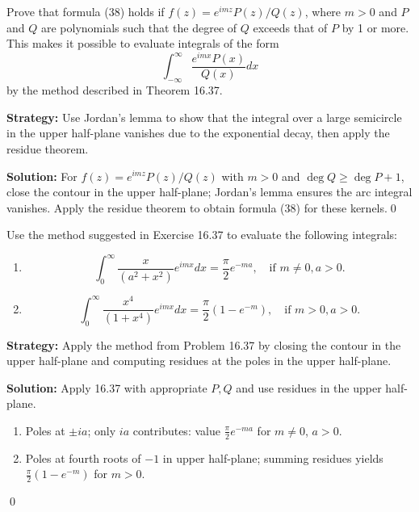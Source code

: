 \begin{problembox}
\begin{problemstatement}
Prove that formula (38) holds if \( f(z) = e^{imz} P(z) / Q(z) \), where \( m > 0 \) and \( P \) and \( Q \) are polynomials such that the degree of \( Q \) exceeds that of \( P \) by 1 or more. This makes it possible to evaluate integrals of the form
\[ \int_{-\infty}^{\infty} \frac{e^{imx} P(x)}{Q(x)} dx \]
by the method described in Theorem 16.37.
\end{problemstatement}
\end{problembox}

\noindent\textbf{Strategy:} Use Jordan's lemma to show that the integral over a large semicircle in the upper half-plane vanishes due to the exponential decay, then apply the residue theorem.

\bigskip\noindent\textbf{Solution:}
For $f(z)=e^{imz}P(z)/Q(z)$ with $m>0$ and $\deg Q\ge \deg P+1$, close the contour in the upper half-plane; Jordan's lemma ensures the arc integral vanishes. Apply the residue theorem to obtain formula (38) for these kernels.\qed


\begin{problembox}
\begin{problemstatement}
Use the method suggested in Exercise 16.37 to evaluate the following integrals:
\begin{enumerate}[label=(\alph*)]
\item \[ \int_0^{\infty} \frac{x}{(a^2 + x^2)} e^{imx} dx = \frac{\pi}{2} e^{-ma}, \quad \text{if } m \neq 0, a > 0. \]
\item \[ \int_0^{\infty} \frac{x^4}{(1 + x^4)} e^{imx} dx = \frac{\pi}{2} (1 - e^{-m}), \quad \text{if } m > 0, a > 0. \]
\end{enumerate}
\end{problemstatement}
\end{problembox}

\noindent\textbf{Strategy:} Apply the method from Problem 16.37 by closing the contour in the upper half-plane and computing residues at the poles in the upper half-plane.

\bigskip\noindent\textbf{Solution:}
Apply 16.37 with appropriate $P,Q$ and use residues in the upper half-plane.
\begin{enumerate}[label=(\alph*)]
\item Poles at $\pm ia$; only $ia$ contributes: value $\frac{\pi}{2}e^{-ma}$ for $m\ne0$, $a>0$.
\item Poles at fourth roots of $-1$ in upper half-plane; summing residues yields $\frac{\pi}{2}(1-e^{-m})$ for $m>0$.
\end{enumerate}\qed


